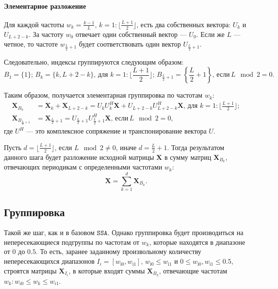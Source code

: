 \documentclass[12pt, specialist, subf
]{disser}
\theoremstyle{definition}
\newcommand{\SSA}{\texttt{SSA}}
\begin{document}
\paragraph{Элементарное разложение \newline}

Для каждой частоты $w_k = \frac{k-1}{L}$, $k = 1:\lfloor \frac{L+1}{2} \rfloor$, есть два собственных вектора: $U_k$ и $U_{L+2-k}$. За частоту $w_0$ отвечает один собственный вектор --- $U_0$. Если же $L$ --- четное, то частоте $w_{\frac{L}{2} + 1}$ будет соответствовать один вектор $U_{\frac{L}{2}+1}$.

Следовательно, индексы группируются следующим образом:
\begin{equation*}
	B_1 = \{1\}; \, B_k = \{k, L+2-k\}, \,  \text{для } k = 1:\lfloor \frac{L+1}{2}\rfloor; \,
	B_{\frac{L}{2} + 1} = \left\{ \frac{L}{2} + 1 \right\}, \, \text{если} \, L\mod 2 = 0.
\end{equation*}

Таким образом, получается элементарная группировка по частотам $w_k$:
\begin{align*}
	\mathbf X_{B_k}                 & = \mathbf X_k + \mathbf X_{L+2-k} = U_k U_k^H \mathbf X + U_{L+2-k} U_{L+2-k}^H \mathbf X, \,  \text{для } k = 1:\lfloor \frac{L+1}{2}\rfloor; \\
	\mathbf X_{B_{\frac{L}{2} + 1}} & = \mathbf X_{{\frac{L}{2} + 1}} =
	U_{\frac{L}{2} + 1} U_{\frac{L}{2} + 1}^H \mathbf X, \, \text{если} \, L \mod 2 = 0,
\end{align*}
где $U^H$ --- это комплексное сопряжение и транспонирование вектора $U$.

Пусть $d = \lfloor \frac{L+1}{2} \rfloor$, если $L \mod 2 \not = 0$, иначе $d = \frac{L}{2} + 1$. Тогда результатом данного шага будет разложение исходной матрицы $\mathbf X$ в сумму матриц $\mathbf{X}_{B_k}$, отвечающих периодикам с определенными частотами $w_k$:
\begin{equation*}
	\mathbf X = \sum\limits_{k=1}^d \mathbf{X}_{B_k} .
\end{equation*}


\subsection*{Группировка}
Такой же шаг, как и в базовом $\SSA$. Однако группировка будет производиться на непересекающиеся подгруппы по частотам от $w_k$, которые находятся в диапазоне от $0$ до $0.5$. То есть, заранее заданному произвольному количеству непересекающихся диапазонов $I_i = \left[w_{\mathrm{i0}}, w_{\mathrm{i1}}\right]$, $w_{\mathrm{i0}} \leq w_{\mathrm{i1}}$ и $0 \leq w_{\mathrm{i0}}, w_{\mathrm{i1}} \leq 0.5$, строятся матрицы $\mathbf X_{I_i}$, в которые входят суммы $\mathbf X_{B_k}$, отвечающие частотам $w_k: w_{i0} \leq w_k \leq w_{i1}$.
\end{document}
